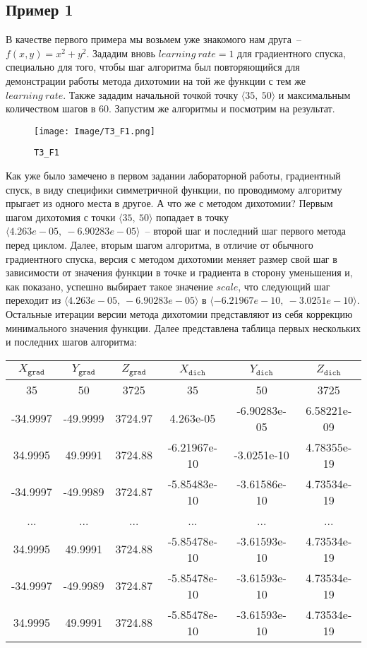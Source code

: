 \documentclass[12pt, a4paper, oneside, final]{article}
\begin{document}
	\subsection*{Пример 1}
	В качестве первого примера мы возьмем уже знакомого нам друга~-- $f(x, y) = x^{2} + y^{2}$. Зададим вновь $learning~rate = 1$ для градиентного спуска, специально для того, чтобы шаг алгоритма был повторяющийся для демонстрации работы метода дихотомии на той же функции с тем же $learning~rate$. Также зададим начальной точкой точку $\langle 35, ~ 50 \rangle$ и максимальным количеством шагов в $60$. Запустим же алгоритмы и посмотрим на результат.
	\begin{figure}[H]
		\centering
		\texttt{[image: Image/T3\_F1.png]}
		\caption*{\texttt{T3\_F1}}
	\end{figure}
	Как уже было замечено в первом задании лабораторной работы, градиентный спуск, в виду специфики симметричной функции, по проводимому алгоритму прыгает из одного места в другое. А что же с методом дихотомии? Первым шагом дихотомия с точки $\langle 35, ~ 50\rangle$ попадает в точку $\langle 4.263e-05, ~  -6.90283e-05\rangle$~-- второй шаг и последний шаг первого метода перед циклом. Далее, вторым шагом алгоритма, в отличие от обычного градиентного спуска, версия с методом дихотомии меняет размер свой шаг в зависимости от значения функции в точке и градиента в сторону уменьшения и, как показано, успешно выбирает такое значение $scale$, что следующий шаг переходит из $\langle 4.263e-05, ~  -6.90283e-05\rangle$ в $\langle -6.21967e-10, ~ -3.0251e-10\rangle$. Остальные итерации версии метода дихотомии представляют из себя коррекцию минимального значения функции.
	Далее представлена таблица первых нескольких и последних шагов алгоритма:
	\begin{table}[H]
		\centering
		\begin{tabular}{|c|c|c|c|c|c|}
			$X_{\texttt{grad}}$ & $Y_{\texttt{grad}}$ & $Z_{\texttt{grad}}$ & $X_{\texttt{dich}}$ & $Y_{\texttt{dich}}$ & $Z_{\texttt{dich}}$ \\ \hline
			35&50&3725&35&50&3725 \\
			-34.9997&-49.9999&3724.97&4.263e-05&-6.90283e-05&6.58221e-09 \\
			34.9995&49.9991&3724.88&-6.21967e-10&-3.0251e-10&4.78355e-19 \\
			-34.9997&-49.9989&3724.87&-5.85483e-10&-3.61586e-10&4.73534e-19 \\
			...&...&...&...&...&... \\
			34.9995&49.9991&3724.88&-5.85478e-10&-3.61593e-10&4.73534e-19 \\
			-34.9997&-49.9989&3724.87&-5.85478e-10&-3.61593e-10&4.73534e-19 \\
			34.9995&49.9991&3724.88&-5.85478e-10&-3.61593e-10&4.73534e-19
		\end{tabular}
	\end{table}
\end{document}
